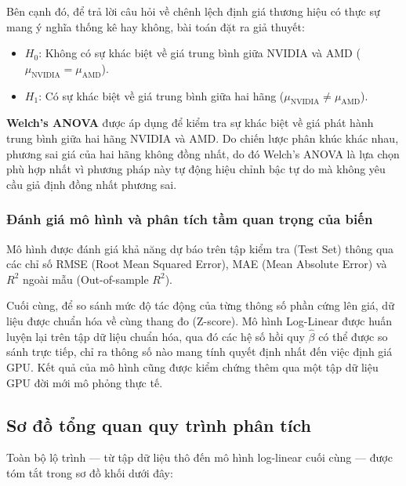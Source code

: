 Bên cạnh đó, để trả lời câu hỏi về chênh lệch định giá thương hiệu có thực sự mang ý nghĩa thống kê hay không, bài toán đặt ra giả thuyết:
\begin{itemize}
    \item $H_0$: Không có sự khác biệt về giá trung bình giữa NVIDIA và AMD ($\mu_{\mathrm{NVIDIA}} = \mu_{\mathrm{AMD}}$).
    \item $H_1$: Có sự khác biệt về giá trung bình giữa hai hãng ($\mu_{\mathrm{NVIDIA}} \neq \mu_{\mathrm{AMD}}$).
\end{itemize}

\textbf{Welch's ANOVA} được áp dụng để kiểm tra sự khác biệt về giá phát hành trung bình giữa hai hãng NVIDIA và AMD. Do chiến lược phân khúc khác nhau, phương sai giá của hai hãng không đồng nhất, do đó Welch's ANOVA là lựa chọn phù hợp nhất vì phương pháp này tự động hiệu chỉnh bậc tự do mà không yêu cầu giả định đồng nhất phương sai.

\subsubsection{Đánh giá mô hình và phân tích tầm quan trọng của biến}

Mô hình được đánh giá khả năng dự báo trên tập kiểm tra (Test Set) thông qua các chỉ số RMSE (Root Mean Squared Error), MAE (Mean Absolute Error) và $R^2$ ngoài mẫu (Out-of-sample $R^2$).

Cuối cùng, để so sánh mức độ tác động của từng thông số phần cứng lên giá, dữ liệu được chuẩn hóa về cùng thang đo (Z-score). Mô hình Log-Linear được huấn luyện lại trên tập dữ liệu chuẩn hóa, qua đó các hệ số hồi quy $\hat{\beta}$ có thể được so sánh trực tiếp, chỉ ra thông số nào mang tính quyết định nhất đến việc định giá GPU. Kết quả của mô hình cũng được kiểm chứng thêm qua một tập dữ liệu GPU đời mới mô phỏng thực tế.

\subsection{Sơ đồ tổng quan quy trình phân tích}

Toàn bộ lộ trình --- từ tập dữ liệu thô đến mô hình log-linear cuối cùng --- được tóm tắt trong sơ đồ khối dưới đây:

